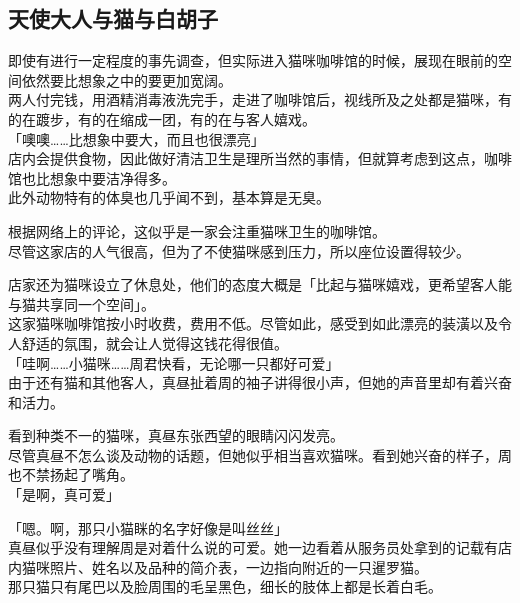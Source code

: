 \subsection{天使大人与猫与白胡子}

即使有进行一定程度的事先调查，但实际进入猫咪咖啡馆的时候，展现在眼前的空间依然要比想象之中的要更加宽阔。\\

两人付完钱，用酒精消毒液洗完手，走进了咖啡馆后，视线所及之处都是猫咪，有的在踱步，有的在缩成一团，有的在与客人嬉戏。\\

「噢噢……比想象中要大，而且也很漂亮」\\

店内会提供食物，因此做好清洁卫生是理所当然的事情，但就算考虑到这点，咖啡馆也比想象中要洁净得多。\\

此外动物特有的体臭也几乎闻不到，基本算是无臭。

根据网络上的评论，这似乎是一家会注重猫咪卫生的咖啡馆。\\

尽管这家店的人气很高，但为了不使猫咪感到压力，所以座位设置得较少。

店家还为猫咪设立了休息处，他们的态度大概是「比起与猫咪嬉戏，更希望客人能与猫共享同一个空间」。\\

这家猫咪咖啡馆按小时收费，费用不低。尽管如此，感受到如此漂亮的装潢以及令人舒适的氛围，就会让人觉得这钱花得很值。\\

「哇啊……小猫咪……周君快看，无论哪一只都好可爱」\\

由于还有猫和其他客人，真昼扯着周的袖子讲得很小声，但她的声音里却有着兴奋和活力。

看到种类不一的猫咪，真昼东张西望的眼睛闪闪发亮。\\

尽管真昼不怎么谈及动物的话题，但她似乎相当喜欢猫咪。看到她兴奋的样子，周也不禁扬起了嘴角。\\

「是啊，真可爱」

「嗯。啊，那只小猫眯的名字好像是叫丝丝」\\

真昼似乎没有理解周是对着什么说的可爱。她一边看着从服务员处拿到的记载有店内猫咪照片、姓名以及品种的简介表，一边指向附近的一只暹罗猫。\\

那只猫只有尾巴以及脸周围的毛呈黑色，细长的肢体上都是长着白毛。

